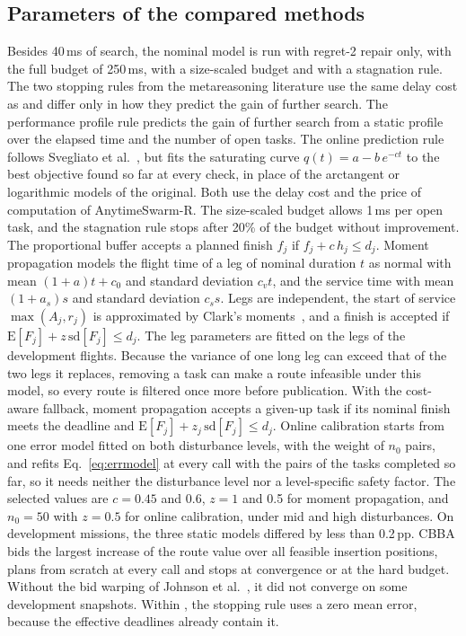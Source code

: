 \subsection{Parameters of the compared methods}\label{sec:Sparams}
Besides 40\,ms of search, the nominal model is run with regret-2 repair only, with the full budget of 250\,ms, with a
size-scaled budget and with a stagnation rule. The two stopping rules from the metareasoning literature use the same
delay cost as \mname{} and differ only in how they predict the gain of further search. The performance profile rule predicts the gain of further search from a static profile over the elapsed time and the
number of open tasks. The online prediction rule follows Svegliato et al.~\cite{svegliato2018meta}, but fits the
saturating curve $q(t)=a-b\,e^{-ct}$ to the best objective found so far at every check, in place of the arctangent or
logarithmic models of the original. Both use the delay cost and the price of computation of AnytimeSwarm-R. The size-scaled budget allows 1\,ms
per open task, and the stagnation rule stops after 20\% of the budget without improvement. The proportional buffer
accepts a planned finish $f_j$ if $f_j+c\,h_j\le d_j$. Moment propagation models the flight time of a leg of nominal
duration $t$ as normal with mean $(1+a)t+c_0$ and standard deviation $c_vt$, and the service time with mean $(1+a_s)s$
and standard deviation $c_ss$. Legs are independent, the start of service $\max(A_j,r_j)$ is approximated by Clark's
moments~\cite{clark1961greatest}, and a finish is accepted if $\mathrm{E}[F_j]+z\,\mathrm{sd}[F_j]\le d_j$. The leg
parameters are fitted on the legs of the development flights. Because the variance of one long leg can exceed that of
the two legs it replaces, removing a task can make a route infeasible under this model, so every route is filtered once
more before publication. With the cost-aware fallback, moment propagation accepts a given-up task if its nominal finish
meets the deadline and $\mathrm{E}[F_j]+z_j\,\mathrm{sd}[F_j]\le d_j$. Online calibration starts from one error model
fitted on both disturbance levels, with the weight of $n_0$ pairs, and refits Eq.~\eqref{eq:errmodel} at every call with
the pairs of the tasks completed so far, so it needs neither the disturbance level nor a level-specific safety factor.
The selected values are $c=0.45$ and 0.6, $z=1$ and 0.5 for moment propagation, and $n_0=50$ with $z=0.5$ for online
calibration, under mid and high disturbances. On development missions, the three static models differed by less than
0.2\,pp. CBBA bids the largest increase of the route value over all feasible insertion positions, plans from scratch at
every call and stops at convergence or at the hard budget. Without the bid warping of Johnson et
al.~\cite{johnson2012nonsubmodular}, it did not converge on some development snapshots. Within \mname{}, the stopping
rule uses a zero mean error, because the effective deadlines already contain it.

